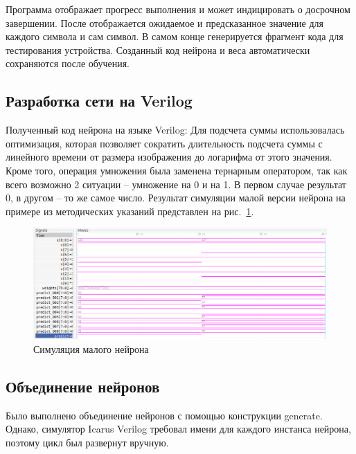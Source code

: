 \documentclass[a4paper,14pt]{article}
\begin{document}
    Программа отображает прогресс выполнения и может индицировать о досрочном завершении.
    После отображается ожидаемое и предсказанное значение для каждого символа и сам символ.
    В самом конце генерируется фрагмент кода для тестирования устройства.
    Созданный код нейрона и веса автоматически сохраняются после обучения.

    \subsection{Разработка сети на Verilog}

    Полученный код нейрона на языке Verilog:
    {\small {}}
    Для подсчета суммы использовалась оптимизация, которая позволяет сократить длительность подсчета суммы с линейного времени от размера изображения до логарифма от этого значения.
    Кроме того, операция умножения была заменена тернарным оператором, так как всего возможно 2 ситуации -- умножение на 0 и на 1.
    В первом случае результат 0, в другом -- то же самое число.
    Результат симуляции малой версии нейрона на примере из методических указаний представлен на рис.~\ref{fig:sim_small}.

    \begin{figure}[H]
        \centering
        \includegraphics[width=\linewidth]{images/sim_small}
        \caption{Симуляция малого нейрона}
        \label{fig:sim_small}
    \end{figure}

    \subsection{Объединение нейронов}

    Было выполнено объединение нейронов с помощью конструкции generate.
    Однако, симулятор Icarus Verilog требовал имени для каждого инстанса нейрона, поэтому цикл был развернут вручную.

    {\small {}}
\end{document}
